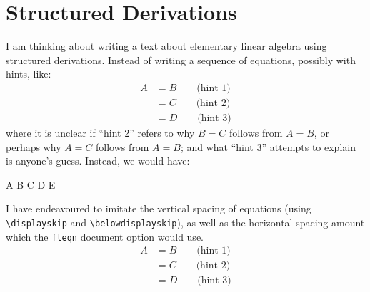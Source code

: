 \section{Structured Derivations}
\M I am thinking about writing a text about elementary linear algebra
using structured derivations. Instead of writing a sequence of
equations, possibly with hints, like:
\begin{subequations}
\begin{align}
  A &= B \qquad\mbox{(hint 1)}\\
  &= C \qquad\mbox{(hint 2)}\\
  &= D \qquad\mbox{(hint 3)}
\end{align}
\end{subequations}
where it is unclear if ``hint 2'' refers to why $B=C$ follows from
$A=B$, or perhaps why $A=C$ follows from $A=B$; and what ``hint 3''
attempts to explain is anyone's guess. Instead, we would have:
\begin{calculation}
  A
  B
  C %
  D
  E
\end{calculation}
I have endeavoured to imitate the vertical spacing of equations (using
\verb#\displayskip# and \verb#\belowdisplayskip#), as well as the
horizontal spacing amount which the \verb#fleqn# document option would
use.
\begin{align*}
  A &= B \qquad\mbox{(hint 1)}\\
  &= C \qquad\mbox{(hint 2)} \\
  &= D \qquad\mbox{(hint 3)}
\end{align*}

